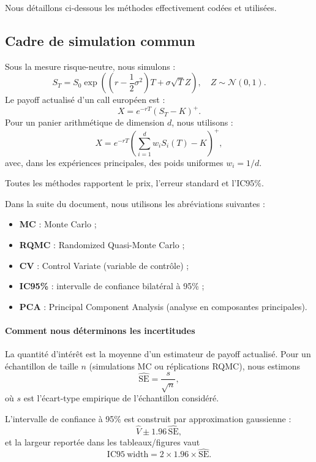 ﻿\documentclass[11pt,a4paper]{article}
\begin{document}
Nous détaillons ci-dessous les méthodes effectivement codées et utilisées.

\subsection{Cadre de simulation commun}

Sous la mesure risque-neutre, nous simulons :
\begin{equation}
S_T = S_0\exp\left(\left(r-\frac{1}{2}\sigma^2\right)T + \sigma\sqrt{T}Z\right), \quad Z\sim\mathcal N(0,1).
\end{equation}
Le payoff actualisé d'un call européen est :
\begin{equation}
X = e^{-rT}(S_T-K)^+.
\end{equation}
Pour un panier arithmétique de dimension $d$, nous utilisons :
\begin{equation}
X = e^{-rT}\left(\sum_{i=1}^d w_i S_i(T)-K\right)^+,
\end{equation}
avec, dans les expériences principales, des poids uniformes $w_i=1/d$.

Toutes les méthodes rapportent le prix, l'erreur standard et l'IC95\%.

Dans la suite du document, nous utilisons les abréviations suivantes :
\begin{itemize}
    \item \textbf{MC} : Monte Carlo ;
    \item \textbf{RQMC} : Randomized Quasi-Monte Carlo ;
    \item \textbf{CV} : Control Variate (variable de contrôle) ;
    \item \textbf{IC95\%} : intervalle de confiance bilatéral à 95\% ;
    \item \textbf{PCA} : Principal Component Analysis (analyse en composantes principales).
\end{itemize}

\paragraph{Comment nous déterminons les incertitudes}
La quantité d'intérêt est la moyenne d'un estimateur de payoff actualisé. Pour un échantillon de taille $n$ (simulations MC ou réplications RQMC), nous estimons
\[
\widehat{\mathrm{SE}} = \frac{s}{\sqrt{n}},
\]
où $s$ est l'écart-type empirique de l'échantillon considéré.

L'intervalle de confiance à 95\% est construit par approximation gaussienne :
\[
\hat V \pm 1.96\,\widehat{\mathrm{SE}},
\]
et la largeur reportée dans les tableaux/figures vaut
\[
\mathrm{IC95\ width} = 2\times 1.96\times \widehat{\mathrm{SE}}.
\]
\end{document}
